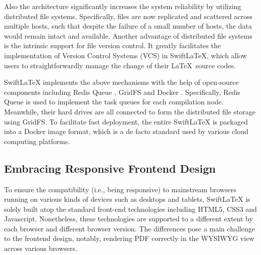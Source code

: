 \documentclass[sigconf]{acmart}
\begin{document}
Also the architecture significantly increases the system reliability by utilizing distributed file systems. 
Specifically, files are now replicated and scattered across multiple hosts, such that despite the failure of a small number of hosts, the data would remain intact and available.
Another advantage of distributed file systems is the intrinsic support for file version control. It greatly facilitates the implementation of Version Control Systems (VCS) in SwiftLaTeX, which allow users to straightforwardly manage the change of their \LaTeX\ source codes.

SwiftLaTeX implements the above mechanisms with the help of open-source components including Redis Queue \cite{carlson2013redis}, GridFS \cite{banker2011mongodb} and Docker \cite{merkel2014docker}. 
Specifically, Redis Queue is used to implement the task queues for each compilation node. Meanwhile, their hard drives are all connected to form the distributed file storage using GridFS. To facilitate fast deployment, the entire SwiftLaTeX is packaged into a Docker image format, which is a de facto standard used by various cloud computing platforms.



\subsection{Embracing Responsive Frontend Design}
To ensure the compatibility (i.e., being responsive) to mainstream browsers running on various kinds of devices such as desktops and tablets, SwiftLaTeX is solely built atop the standard front-end technologies including HTML5, CSS3 and Javascript. 
Nonetheless, these technologies are supported to a different extent by each browser and different browser version. 
The differences pose a main challenge to the frontend design, notably, rendering PDF correctly  in the WYSIWYG view across various browsers.
\end{document}
